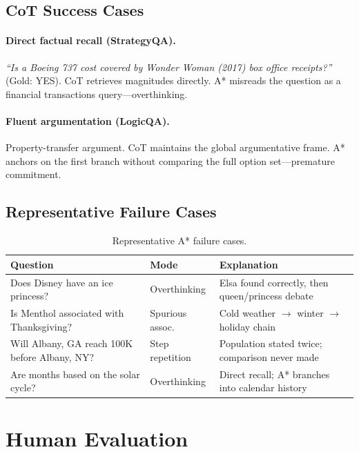 \documentclass[11pt]{article}
\begin{document}
\subsection{CoT Success Cases}

\paragraph{Direct factual recall (StrategyQA).}
\emph{``Is a Boeing 737 cost covered by Wonder Woman (2017) box office receipts?''} (Gold: YES). CoT retrieves magnitudes directly. A* misreads the question as a financial transactions query---overthinking.

\paragraph{Fluent argumentation (LogicQA).}
Property-transfer argument. CoT maintains the global argumentative frame. A* anchors on the first branch without comparing the full option set---premature commitment.

\subsection{Representative Failure Cases}

\begin{table}[h]
\centering
\caption{Representative A* failure cases.}
\label{tab:failure_cases}
\small
\begin{tabular}{@{}p{5cm}lp{5cm}@{}}
\toprule
\textbf{Question} & \textbf{Mode} & \textbf{Explanation} \\
\midrule
Does Disney have an ice princess? & Overthinking & Elsa found correctly, then queen/princess debate \\
Is Menthol associated with Thanksgiving? & Spurious assoc. & Cold weather $\rightarrow$ winter $\rightarrow$ holiday chain \\
Will Albany, GA reach 100K before Albany, NY? & Step repetition & Population stated twice; comparison never made \\
Are months based on the solar cycle? & Overthinking & Direct recall; A* branches into calendar history \\
\bottomrule
\end{tabular}
\end{table}

\section{Human Evaluation}
\label{app:human}
\end{document}
